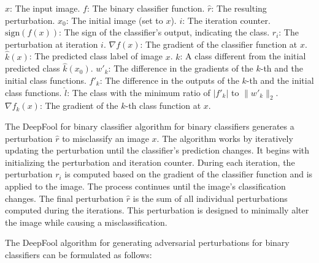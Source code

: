 $x$: The input image. 
$f$: The binary classifier function. 
$\hat{r}$: The resulting perturbation. 
$x_0$: The initial image (set to $x$).
$i$: The iteration counter. 
$\text{sign}(f(x))$: The sign of the classifier's output, indicating the class. 
$r_i$: The perturbation at iteration $i$. 
$\nabla f(x)$: The gradient of the classifier function at $x$.
$\hat{k}(x)$: The predicted class label of image $x$. 
$k$: A class different from the initial predicted class $\hat{k}(x_0)$. 
$w'_k$: The difference in the gradients of the $k$-th and the initial class functions. 
$f'_k$: The difference in the outputs of the $k$-th and the initial class functions. 
$\hat{l}$: The class with the minimum ratio of $|f'_k|$ to $\|w'_k\|_2$.
$\nabla f_k(x)$: The gradient of the $k$-th class function at $x$.

The DeepFool for binary classifier algorithm for binary classifiers generates a perturbation $\hat{r}$ to misclassify an image $x$. The algorithm works by iteratively updating the perturbation until the classifier's prediction changes. It begins with initializing the perturbation and iteration counter. During each iteration, the perturbation $r_i$ is computed based on the gradient of the classifier function and is applied to the image. The process continues until the image's classification changes. The final perturbation $\hat{r}$ is the sum of all individual perturbations computed during the iterations. This perturbation is designed to minimally alter the image while causing a misclassification.

 The DeepFool algorithm for generating adversarial perturbations for binary classifiers can be formulated as follows:

